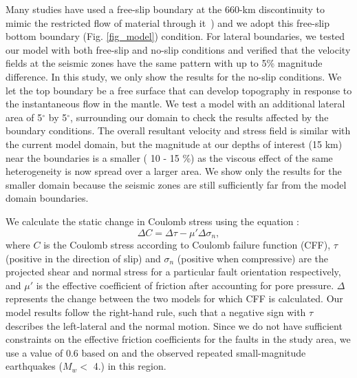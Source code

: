 \documentclass[draft,linenumbers]{agujournal2018}
\begin{document}
Many studies have used a free-slip boundary at the 660-km discontinuity to mimic the restricted flow of material through it~\citep[e.g.,][]{arcay2007slab, billen2007rheologic, quinquis2011role}) and we adopt this free-slip bottom boundary (Fig. \ref{fig_model}) condition. For lateral boundaries, we tested our model with both free-slip and no-slip conditions and verified that the velocity fields at the seismic zones have the same pattern with up to 5\% magnitude difference. In this study, we only show the results for the no-slip conditions. We let the top boundary be a free surface
that can develop topography in response to the instantaneous flow in the mantle. We test a model with an additional lateral area of 5$^{\circ}$ by 5$^{\circ}$, surrounding our domain to check the results affected by the boundary conditions. The overall resultant velocity and stress field is similar with the current model domain, but the magnitude at our depths of interest (15 km) near the boundaries is a smaller ( 10 - 15 \%) as the viscous effect of the same heterogeneity is now spread over a larger area. We show only the results for the smaller domain because the seismic zones are still sufficiently far from the model domain boundaries.

We calculate the static change in Coulomb stress using the equation \citep{king1994static}:
\begin{equation}
    \Delta C = \Delta \tau - \mu' \Delta \sigma_n,
\end{equation}
%
where $C$ is the Coulomb stress according to Coulomb failure function (CFF), $\tau$ (positive in the direction of slip) and $\sigma_n$ (positive when compressive) are the projected shear and normal stress for a particular fault orientation respectively, and $\mu'$ is the effective coefficient of friction after accounting for pore pressure. $\Delta$ represents the change between the two models for which CFF is calculated. Our model results follow the right-hand rule, such that a negative sign with $\tau$ describes the left-lateral and the normal motion.
Since we do not have sufficient constraints on the effective friction coefficients for the faults in the study area, we use a value of 0.6 based on \citet{hurd2012intraplate} and the observed repeated small-magnitude earthquakes ($M_w <$ 4.) in this region. 
\end{document}
